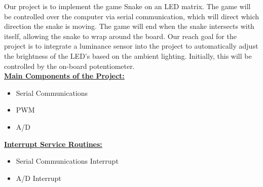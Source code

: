 \documentclass[11pt]{article}
\newcommand{\linespace} {\vspace{\baselineskip}}
\begin{document}
    Our project is to implement the game Snake on an LED matrix. The game will be controlled over the computer via serial communication,
    which will direct which direction the snake is moving. The game will end when the snake intersects with itself, allowing the snake
    to wrap around the board. Our reach goal for the project is to integrate a luminance sensor into the project to automatically adjust
    the brightness of the LED's based on the ambient lighting. Initially, this will be controlled by the on-board potentiometer. \\

    \noindent \textbf{\underline{Main Components of the Project:}}
    \begin{itemize}[noitemsep]
        \item Serial Communications
        \item PWM
        \item A/D
    \end{itemize}

    \noindent \textbf{\underline{Interrupt Service Routines:}}
    \begin{itemize}[noitemsep]
        \item Serial Communications Interrupt
        \item A/D Interrupt
    \end{itemize} \linespace
\end{document}
